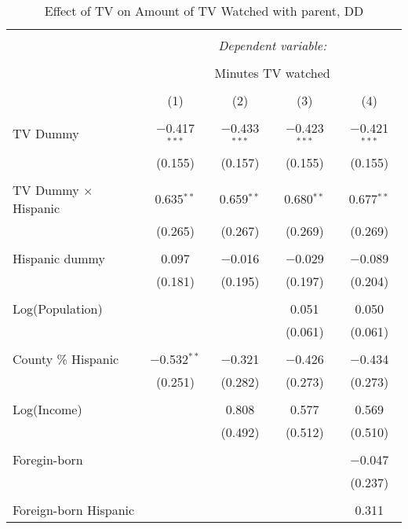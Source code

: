 
\begin{table}[!htbp] \centering 
  \caption{Effect of TV on Amount of TV Watched with parent, DD} 
  \label{} 
\begin{tabular}{@{\extracolsep{-5pt}}lcccc} 
\\[-1.8ex]\hline 
\hline \\[-1.8ex] 
 & \multicolumn{4}{c}{\textit{Dependent variable:}} \\ 
\cline{2-5} 
\\[-1.8ex] & \multicolumn{4}{c}{Minutes TV watched} \\ 
\\[-1.8ex] & (1) & (2) & (3) & (4)\\ 
\hline \\[-1.8ex] 
 TV Dummy & $-$0.417$^{***}$ & $-$0.433$^{***}$ & $-$0.423$^{***}$ & $-$0.421$^{***}$ \\ 
  & (0.155) & (0.157) & (0.155) & (0.155) \\ 
  & & & & \\ 
 TV Dummy $\times$ Hispanic  & 0.635$^{**}$ & 0.659$^{**}$ & 0.680$^{**}$ & 0.677$^{**}$ \\ 
  & (0.265) & (0.267) & (0.269) & (0.269) \\ 
  & & & & \\ 
 Hispanic dummy & 0.097 & $-$0.016 & $-$0.029 & $-$0.089 \\ 
  & (0.181) & (0.195) & (0.197) & (0.204) \\ 
  & & & & \\ 
 Log(Population) &  &  & 0.051 & 0.050 \\ 
  &  &  & (0.061) & (0.061) \\ 
  & & & & \\ 
 County \% Hispanic & $-$0.532$^{**}$ & $-$0.321 & $-$0.426 & $-$0.434 \\ 
  & (0.251) & (0.282) & (0.273) & (0.273) \\ 
  & & & & \\ 
 Log(Income) &  & 0.808 & 0.577 & 0.569 \\ 
  &  & (0.492) & (0.512) & (0.510) \\ 
  & & & & \\ 
 Foregin-born &  &  &  & $-$0.047 \\ 
  &  &  &  & (0.237) \\ 
  & & & & \\ 
 Foreign-born Hispanic &  &  &  & 0.311 \\ 

\end{tabular}
\end{table}
